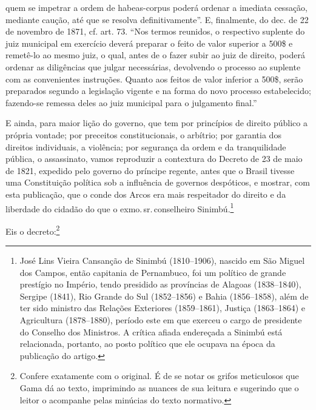 {  quem se impetrar a ordem de habeas-corpus poderá ordenar a imediata
  cessação, mediante caução, até que se resolva definitivamente''. E,
  finalmente, do dec. de 22 de novembro de 1871, cf. art. 73. ``Nos termos reunidos,
  o respectivo suplente do juiz municipal em exercício deverá preparar o
  feito de valor superior a 500\$ e remetê-lo ao mesmo juiz, o qual,
  antes de o fazer subir ao juiz de direito, poderá ordenar as
  diligências que julgar necessárias, devolvendo o processo ao suplente
  com as convenientes instruções. Quanto aos feitos de valor inferior a
  500\$, serão preparados segundo a legislação vigente e na forma do
  novo processo estabelecido; fazendo-se remessa deles ao juiz municipal
  para o julgamento final.''}

E ainda, para maior lição do governo, que tem por princípios de direito
público a própria vontade; por preceitos constitucionais, o arbítrio;
por garantia dos direitos individuais, a violência; por segurança da
ordem e da tranquilidade pública, o assassinato, vamos reproduzir a
contextura do Decreto de 23 de maio de 1821, expedido pelo governo do
príncipe regente, antes que o Brasil tivesse uma Constituição política
sob a influência de governos despóticos, e mostrar, com esta publicação,
que o conde dos Arcos era mais respeitador do direito e da liberdade do
cidadão do que o exmo.\,sr.\,conselheiro Sinimbú.\footnote{José Lins
  Vieira Cansanção de Sinimbú (1810--1906), nascido em São Miguel dos
  Campos, então capitania de Pernambuco, foi um político de grande
  prestígio no Império, tendo presidido as províncias de Alagoas
  (1838--1840), Sergipe (1841), Rio Grande do Sul (1852--1856) e Bahia
  (1856--1858), além de ter sido ministro das Relações Exteriores
  (1859--1861), Justiça (1863--1864) e Agricultura (1878--1880), período
  este em que exerceu o cargo de presidente do Conselho dos Ministros. A
  crítica afiada endereçada a Sinimbú está relacionada, portanto, ao
  posto político que ele ocupava na época da publicação do artigo.}

Eis o decreto:\footnote{Confere exatamente com o original. É de se
  notar os grifos meticulosos que Gama dá ao texto, imprimindo as
  nuances de sua leitura e sugerindo que o leitor o acompanhe pelas
  minúcias do texto normativo.}

